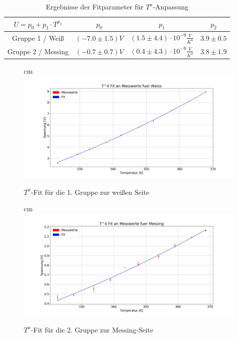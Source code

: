 \documentclass[a4paper, 11pt]{article}
\begin{document}
\begin{table}[H]
\Large
\centering
	\begin{tabular}{|c|c|c|c|}
	\hline $ U=p_0+p_1\cdot T^{p_2}$& $p_0$& $p_1$ & $p_2$\\
	\hline Gruppe 1 / Weiß & $(-7.0 \pm 1.5)V $ & $ (1.5 \pm 4.4  )\cdot 10^{-9}\frac{V}{K^4}$  & $ 3.9\pm 0.5 $ \\
	\hline Gruppe 2 / Messing &  $(-0.7 \pm 0.7)V $ & $ (0.4 \pm 4.3  )\cdot 10^{-9}\frac{V}{K^4}$  & $ 3.8\pm 1.9 $  \\
	\hline
	\end{tabular}
\caption{Ergebnisse der Fitparameter für $T^x$-Anpassung}
\label{table:ErgebnisseTxFit}
\end{table}

\newpage

\begin{figure}[H]
	 cm
	\includegraphics[scale=0.42]{Bilder/Gruppe1_Fit_Weiss.png}%
	\caption{$T^x$-Fit für die 1. Gruppe zur weißen Seite}%
	\label{pic:T4FitG1Weiss}%
\end{figure}

\begin{figure}[H]
	 cm
	\includegraphics[scale=0.42]{Bilder/Gruppe2_Fit_Messing.png}%
	\caption{$T^x$-Fit für die 2. Gruppe zur Messing-Seite}%
	\label{pic:T4FitG2Messing}%
\end{figure}
\end{document}
